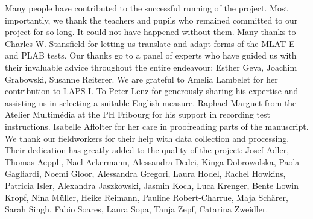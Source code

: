 \documentclass[output=paper]{langsci/langscibook}
\begin{document}
Many people have contributed to the successful running of the project. Most importantly, we thank the teachers and pupils who remained committed to our project for so long. It could not have happened without them. Many thanks to Charles W. Stansfield for letting us translate and adapt forms of the MLAT-E and PLAB tests. Our thanks go to a panel of experts who have guided us with their invaluable advice throughout the entire endeavour: Esther Geva, Joachim Grabowski, Susanne Reiterer. We are grateful to Amelia Lambelet for her contribution to LAPS I. To Peter Lenz for generously sharing his expertise and assisting us in selecting a suitable English measure. Raphael Marguet from the Atelier Multimédia at the PH Fribourg for his support in recording test instructions. Isabelle Affolter for her care in proofreading parts of the manuscript. We thank our fieldworkers for their help with data collection and processing. Their dedication has greatly added to the quality of the project: Josef Adler, Thomas Aeppli, Nael Ackermann, Alessandra Dedei, Kinga Dobrowolska, Paola Gagliardi, Noemi Gloor, Alessandra Gregori, Laura Hodel, Rachel Howkins, Patricia Isler, Alexandra Jaszkowski, Jasmin Koch, Luca Krenger, Bente Lowin Kropf, Nina Müller, Heike Reimann, Pauline Robert-Charrue, Maja Schärer, Sarah Singh, Fabio Soares, Laura Sopa, Tanja Zepf, Catarina Zweidler. 

{\sloppy\printbibliography[heading=subbibliography,notkeyword=this]}
\end{document}
